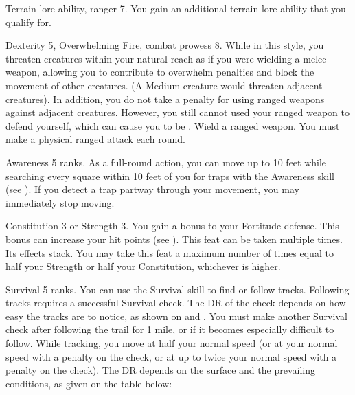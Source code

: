 \featpre Terrain lore ability, ranger 7.
\featben You gain an additional terrain lore ability that you qualify for.

\featpres Dexterity 5, Overwhelming Fire, combat prowess 8.
\featben While in this style, you threaten creatures within your natural reach as if you were wielding a melee weapon, allowing you to contribute to overwhelm penalties and block the movement of other creatures.
(A Medium creature would threaten adjacent creatures).
In addition, you do not take a  penalty for using ranged weapons against adjacent creatures.
However, you still cannot used your ranged weapon to defend yourself, which can cause you to be .
\stylereq Wield a ranged weapon.
You must make a physical ranged attack each round.

\featpre Awareness 5 ranks.
\featben As a full-round action, you can move up to 10 feet while searching every square within 10 feet of you for traps with the Awareness skill (see ).
If you detect a trap partway through your movement, you may immediately stop moving.

\featpre Constitution 3 or Strength 3.
\featben You gain a  bonus to your Fortitude defense.
This bonus can increase your hit points (see ).
 This feat can be taken multiple times. Its effects stack.
You may take this feat a maximum number of times equal to half your Strength or half your Constitution, whichever is higher.

\featpre Survival 5 ranks.
\featben You can use the Survival skill to find or follow tracks.
Following tracks requires a successful Survival check.
The DR of the check depends on how easy the tracks are to notice, as shown on  and .
You must make another Survival check after following the trail for 1 mile, or if it becomes especially difficult to follow.
While tracking, you move at half your normal speed (or at your normal speed with a  penalty on the check, or at up to twice your normal speed with a  penalty on the check).
The DR depends on the surface and the prevailing conditions, as given on the table below:

